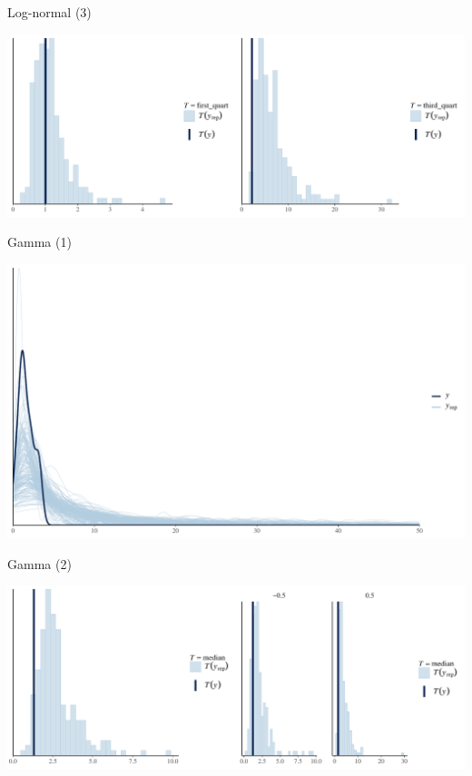 \documentclass[ignorenonframetext,a4paper]{beamer}
\begin{document}
\begin{frame}{Log-normal (3)}

\includegraphics{DB_presentation_case_study_files/figure-beamer/unnamed-chunk-19-1.pdf}

\end{frame}

\begin{frame}{Gamma (1)}

\includegraphics{DB_presentation_case_study_files/figure-beamer/unnamed-chunk-20-1.pdf}

\end{frame}

\begin{frame}{Gamma (2)}

\includegraphics{DB_presentation_case_study_files/figure-beamer/unnamed-chunk-21-1.pdf}

\end{frame}
\end{document}

